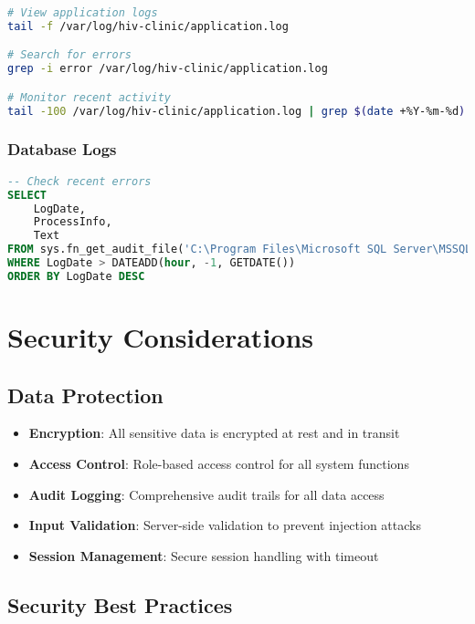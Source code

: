 \documentclass[12pt,a4paper]{article}
\begin{document}
\begin{lstlisting}[language=bash, caption=Backend Log Monitoring]
# View application logs
tail -f /var/log/hiv-clinic/application.log

# Search for errors
grep -i error /var/log/hiv-clinic/application.log

# Monitor recent activity
tail -100 /var/log/hiv-clinic/application.log | grep $(date +%Y-%m-%d)
\end{lstlisting}

\subsubsection{Database Logs}

\begin{lstlisting}[language=SQL, caption=Database Log Monitoring]
-- Check recent errors
SELECT 
    LogDate,
    ProcessInfo,
    Text
FROM sys.fn_get_audit_file('C:\Program Files\Microsoft SQL Server\MSSQL15.MSSQLSERVER\MSSQL\Log\*.sqlaudit', NULL, NULL)
WHERE LogDate > DATEADD(hour, -1, GETDATE())
ORDER BY LogDate DESC
\end{lstlisting}

\section{Security Considerations}

\subsection{Data Protection}

\begin{itemize}
    \item \textbf{Encryption}: All sensitive data is encrypted at rest and in transit
    \item \textbf{Access Control}: Role-based access control for all system functions
    \item \textbf{Audit Logging}: Comprehensive audit trails for all data access
    \item \textbf{Input Validation}: Server-side validation to prevent injection attacks
    \item \textbf{Session Management}: Secure session handling with timeout
\end{itemize}

\subsection{Security Best Practices}
\end{document}

